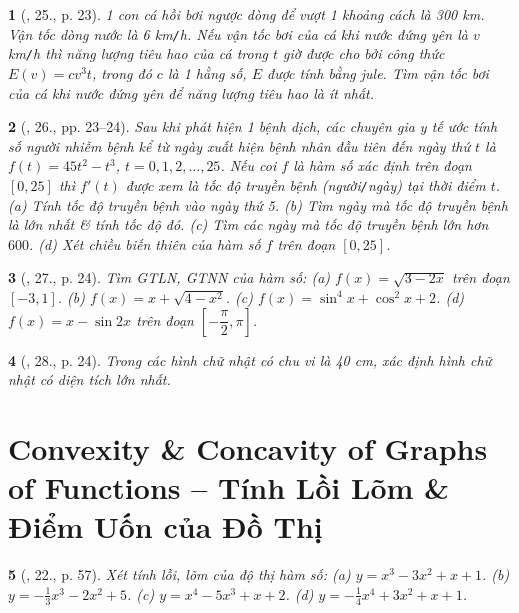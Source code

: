 \documentclass{article}
\newtheorem{baitoan}{}
\begin{document}
\begin{baitoan}[\cite{SGK_Toan_12_giai_tich_nang_cao}, 25., p. 23]
	1 con cá hồi bơi ngược dòng để vượt 1 khoảng cách là {\rm300 km}. Vận tốc dòng nước là {\rm6 km{\tt/}h}. Nếu vận tốc bơi của cá khi nước đứng yên là $v$ {\rm km{\tt/}h} thì năng lượng tiêu hao của cá trong $t$ giờ được cho bởi công thức $E(v) = cv^3t$, trong đó $c$ là 1 hằng số, $E$ được tính bằng jule. Tìm vận tốc bơi của cá khi nước đứng yên để năng lượng tiêu hao là ít nhất.
\end{baitoan}

\begin{baitoan}[\cite{SGK_Toan_12_giai_tich_nang_cao}, 26., pp. 23--24]
	Sau khi phát hiện 1 bệnh dịch, các chuyên gia y tế ước tính số người nhiễm bệnh kể từ ngày xuất hiện bệnh nhân đầu tiên đến ngày thứ $t$ là $f(t) = 45t^2 - t^3$, $t = 0,1,2,\ldots,25$. Nếu coi $f$ là hàm số xác định trên đoạn $[0,25]$ thì $f'(t)$ được xem là tốc độ truyền bệnh (người{\tt/}ngày) tại thời điểm $t$. (a) Tính tốc độ truyền bệnh vào ngày thứ 5. (b) Tìm ngày mà tốc độ truyền bệnh là lớn nhất \& tính tốc độ đó. (c) Tìm các ngày mà tốc độ truyền bệnh lớn hơn $600$. (d) Xét chiều biến thiên của hàm số $f$ trên đoạn $[0,25]$.
\end{baitoan}

\begin{baitoan}[\cite{SGK_Toan_12_giai_tich_nang_cao}, 27., p. 24]
	Tìm {\rm GTLN, GTNN} của hàm số: (a) $f(x) = \sqrt{3 - 2x}$ trên đoạn $[-3,1]$. (b) $f(x) = x + \sqrt{4 - x^2}$. (c) $f(x) = \sin^4x + \cos^2x + 2$. (d) $f(x) = x - \sin2x$ trên đoạn $\left[-\dfrac{\pi}{2},\pi\right]$.
\end{baitoan}

\begin{baitoan}[\cite{SGK_Toan_12_giai_tich_nang_cao}, 28., p. 24]
	Trong các hình chữ nhật có chu vi là {\rm40 cm}, xác định hình chữ nhật có diện tích lớn nhất.
\end{baitoan}


\section{Convexity \& Concavity of Graphs of Functions -- Tính Lồi Lõm \& Điểm Uốn của Đồ Thị}

\begin{baitoan}[\cite{TLCT_BT_dai_so_giai_tich_11}, 22., p. 57]
	Xét tính lồi, lõm của độ thị hàm số: (a) $y = x^3 - 3x^2 + x + 1$. (b) $y = -\frac{1}{3}x^3 - 2x^2 + 5$. (c) $y = x^4 - 5x^3 + x + 2$. (d) $y = -\frac{1}{4}x^4 + 3x^2 + x + 1$.
\end{baitoan}
\end{document}
